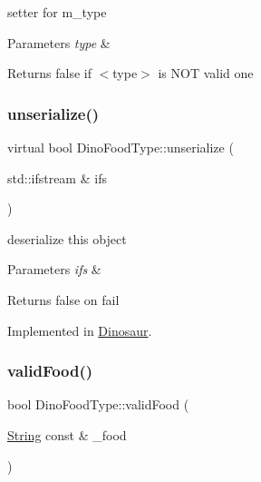 setter for m\+\_\+type 
\begin{DoxyParams}{Parameters}
{\em type} & \\
\hline
\end{DoxyParams}
\begin{DoxyReturn}{Returns}
false if $<$type$>$ is N\+OT valid one 
\end{DoxyReturn}
\mbox{\label{classDinoFoodType_a05018adfc6e5cbf1e7a28d77eab5cf84}} 
\subsubsection{\texorpdfstring{unserialize()}{unserialize()}}
{\footnotesize\ttfamily virtual bool Dino\+Food\+Type\+::unserialize (\begin{DoxyParamCaption}\item[{std\+::ifstream \&}]{ifs }\end{DoxyParamCaption})\hspace{0.3cm}{\ttfamily [pure virtual]}}

deserialize this object 
\begin{DoxyParams}{Parameters}
{\em ifs} & \\
\hline
\end{DoxyParams}
\begin{DoxyReturn}{Returns}
false on fail 
\end{DoxyReturn}


Implemented in \hyperlink{classDinosaur_aa84990b3102df65a9573117dec077518}{Dinosaur}.

\mbox{\label{classDinoFoodType_a9c4b7db38e82a1774b0c2a9ff4e296f2}} 
\subsubsection{\texorpdfstring{valid\+Food()}{validFood()}}
{\footnotesize\ttfamily bool Dino\+Food\+Type\+::valid\+Food (\begin{DoxyParamCaption}\item[{\hyperlink{classString}{String} const \&}]{\+\_\+food }\end{DoxyParamCaption})\hspace{0.3cm}{\ttfamily [static]}}

